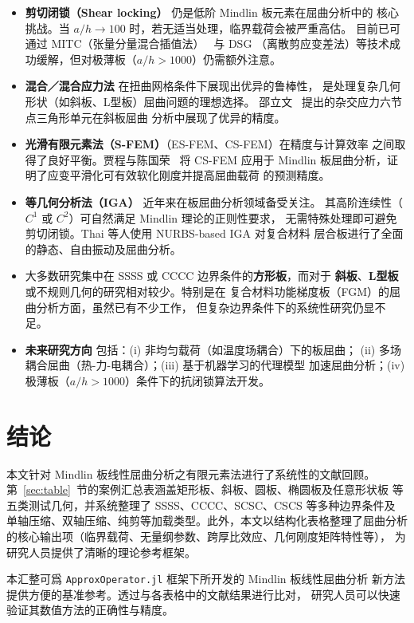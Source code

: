 \documentclass[12pt,a4paper]{article}
\begin{document}
\begin{itemize}
    \item \textbf{剪切闭锁（Shear locking）} 仍是低阶 Mindlin 板元素在屈曲分析中的
        核心挑战。当 $a/h \to 100$ 时，若无适当处理，临界载荷会被严重高估。
    目前已可通过 MITC（张量分量混合插值法）~\cite{bathe1985fournode} 与 DSG
        （离散剪应变差法）等技术成功缓解，但对极薄板（$a/h > 1000$）仍需额外注意。

    \item \textbf{混合／混合应力法} 在扭曲网格条件下展现出优异的鲁棒性，
        是处理复杂几何形状（如斜板、L型板）屈曲问题的理想选择。
        邵立文~\cite{shao2021buckling} 提出的杂交应力六节点三角形单元在斜板屈曲
        分析中展现了优异的精度。

    \item \textbf{光滑有限元素法（S-FEM）}（ES-FEM、CS-FEM）在精度与计算效率
        之间取得了良好平衡。贾程与陈国荣~\cite{jia2013mindlin} 将 CS-FEM
        应用于 Mindlin 板屈曲分析，证明了应变平滑化可有效软化刚度并提高屈曲载荷
        的预测精度。

    \item \textbf{等几何分析法（IGA）} 近年来在板屈曲分析领域备受关注。
        其高阶连续性（$C^{1}$ 或 $C^{2}$）可自然满足 Mindlin 理论的正则性要求，
        无需特殊处理即可避免剪切闭锁。Thai 等人使用 NURBS-based IGA 对复合材料
        层合板进行了全面的静态、自由振动及屈曲分析。

    \item 大多数研究集中在 SSSS 或 CCCC 边界条件的\textbf{方形板}，而对于
        \textbf{斜板}、\textbf{L型板}或不规则几何的研究相对较少。特别是在
        复合材料功能梯度板（FGM）的屈曲分析方面，虽然已有不少工作，
        但复杂边界条件下的系统性研究仍显不足。

    \item \textbf{未来研究方向} 包括：(i) 非均匀载荷（如温度场耦合）下的板屈曲；
        (ii) 多场耦合屈曲（热-力-电耦合）；(iii) 基于机器学习的代理模型
        加速屈曲分析；(iv) 极薄板（$a/h > 1000$）条件下的抗闭锁算法开发。
\end{itemize}

\section{结论}
本文针对 Mindlin 板线性屈曲分析之有限元素法进行了系统性的文献回顾。
第~\ref{sec:table}~节的案例汇总表涵盖矩形板、斜板、圆板、椭圆板及任意形状板
等五类测试几何，并系统整理了 SSSS、CCCC、SCSC、CSCS 等多种边界条件及
单轴压缩、双轴压缩、纯剪等加载类型。此外，本文以结构化表格整理了屈曲分析
的核心输出项（临界载荷、无量纲参数、跨厚比效应、几何刚度矩阵特性等），
为研究人员提供了清晰的理论参考框架。

本汇整可爲 \texttt{ApproxOperator.jl} 框架下所开发的 Mindlin 板线性屈曲分析
新方法提供方便的基准参考。透过与各表格中的文献结果进行比对，
研究人员可以快速验证其数值方法的正确性与精度。
\end{document}
